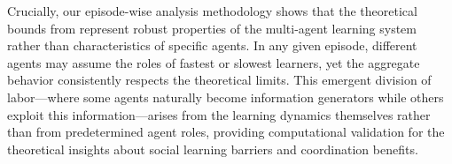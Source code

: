 Crucially, our episode-wise analysis methodology shows that the theoretical bounds from \citet{brandl2024} represent robust properties of the multi-agent learning system rather than characteristics of specific agents. In any given episode, different agents may assume the roles of fastest or slowest learners, yet the aggregate behavior consistently respects the theoretical limits. This emergent division of labor—where some agents naturally become information generators while others exploit this information—arises from the learning dynamics themselves rather than from predetermined agent roles, providing computational validation for the theoretical insights about social learning barriers and coordination benefits.


